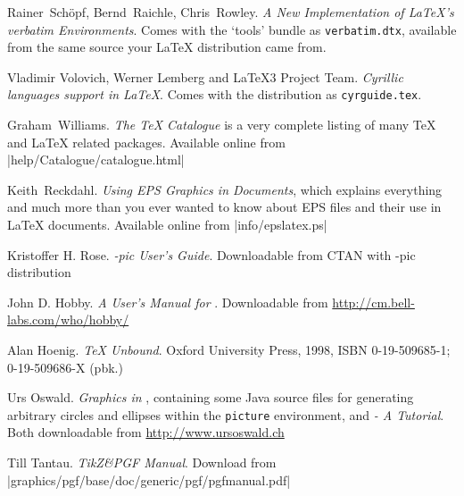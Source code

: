 \begin{thebibliography}{99}
 Rainer~Sch\"opf, Bernd~Raichle, Chris~Rowley.  
\newblock \emph{A New Implementation of \LaTeX's verbatim
  Environments}.
 \newblock Comes with the `tools' bundle as
  \texttt{verbatim.dtx}, available from the same source your \LaTeX{}
  distribution came from. 

 Vladimir Volovich, Werner Lemberg and \LaTeX3 Project Team.                    
    \newblock \emph{Cyrillic languages support in \LaTeX}.                                        
    \newblock Comes with the \LaTeXe{} distribution as                                            
  \texttt{cyrguide.tex}.                                                                          

 Graham~Williams.  \newblock \emph{The TeX
    Catalogue} is a very complete listing of many \TeX{} and \LaTeX{}
    related packages.
  \newblock Available online from \CTAN|help/Catalogue/catalogue.html|
  
 Keith~Reckdahl.  \newblock \emph{Using EPS Graphics in
    \LaTeXe{} Documents}, which explains everything and much more than
  you ever wanted to know about EPS files and their use in \LaTeX{}
  documents.  \newblock Available online from
  \CTAN|info/epslatex.ps|

 Kristoffer H. Rose.
  \newblock \emph{\Xy-pic User's Guide}.  \newblock
  Downloadable from CTAN with \Xy-pic distribution 
  
 John D. Hobby.
  \newblock \emph{A User's Manual for \MP}. \newblock
  Downloadable from \url{http://cm.bell-labs.com/who/hobby/} 
  
 Alan Hoenig.
  \newblock \emph{\TeX{} Unbound}. \newblock Oxford University Press, 1998,
    ISBN 0-19-509685-1; 0-19-509686-X (pbk.) 
  
 Urs Oswald.  
    \newblock \emph{Graphics in \LaTeXe{}}, containing some Java source files for 
    generating arbitrary circles and ellipses within the \texttt{picture} environment,
    and \emph{\MP{} - A Tutorial}.
  \newblock Both downloadable from \url{http://www.ursoswald.ch}

 Till Tantau.
  \newblock \emph{TikZ\&PGF Manual}.\newblock
  Download from \CTAN|graphics/pgf/base/doc/generic/pgf/pgfmanual.pdf|
  
  

\end{thebibliography}


%

